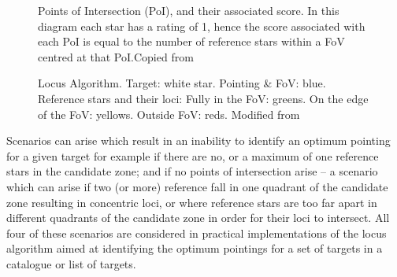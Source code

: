 \documentclass[]{elsarticle} %
\begin{document}
\begin{figure}[!htb]
\caption{\label{PoIscores}Points of Intersection (PoI), and their associated
score. In this diagram each star has a rating of 1, hence the score
associated with each PoI is equal to the number of reference stars
within a FoV centred at that PoI.Copied from \citet{creaner2016thesis}}
\end{figure}

\begin{figure}[!htb]
\caption{\label{final}Locus Algorithm. Target: white star. Pointing \& FoV:
blue. Reference stars and their loci: Fully in the FoV: greens. On the
edge of the FoV: yellows. Outside FoV: reds.  Modified from \citet{creaner2016thesis}}
\end{figure}

Scenarios can arise which result in an inability to identify an optimum
pointing for a given target for example if there are no, or a maximum of
one reference stars in the candidate zone; and if no points of
intersection arise -- a scenario which can arise if two (or more)
reference fall in one quadrant of the candidate zone resulting in
concentric loci, or where reference stars are too far apart in different
quadrants of the candidate zone in order for their loci to intersect.
All four of these scenarios are considered in practical implementations
of the locus algorithm aimed at identifying the optimum pointings for a
set of targets in a catalogue or list of targets.
\end{document}
